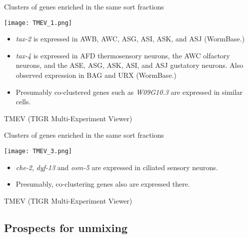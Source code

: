 \documentclass[serif,9pt]{beamer}
\begin{document}
\begin{frame}{Clusters of genes enriched in the same sort fractions}
\begin{minipage}{0.5\textwidth}
\texttt{[image: TMEV\_1.png]}
\end{minipage}
\begin{minipage}{0.48\textwidth}
{\small 
\begin{itemize}

\item {\em tax-2} is expressed in AWB, AWC, ASG, ASI, ASK, and ASJ (WormBase.)

\item {\em tax-4} is expressed in AFD thermosensory neurons, the AWC olfactory neurons, and the ASE, ASG, ASK, ASI, and ASJ gustatory neurons. Also observed expression in BAG and URX (WormBase.)

\item Presumably co-clustered genes such as {\em W09G10.3} are expressed
in similar cells.

\end{itemize}
}
\end{minipage}
\vspace{5mm}

\hfill TMEV (TIGR Multi-Experiment Viewer)
\end{frame}

\begin{frame}{Clusters of genes enriched in the same sort fractions}

\begin{minipage}{0.45\textwidth}
\texttt{[image: TMEV\_3.png]}
\end{minipage}
\begin{minipage}{0.48\textwidth}
\begin{itemize}

\item {\em che-2}, {\em dyf-13} and {\em osm-5} are expressed in ciliated
sensory neurons.

\item Presumably, co-clustering genes also are expressed there.
\end{itemize}

\end{minipage}

\hfill TMEV (TIGR Multi-Experiment Viewer)
\end{frame}

\subsection{Prospects for unmixing}
\end{document}
